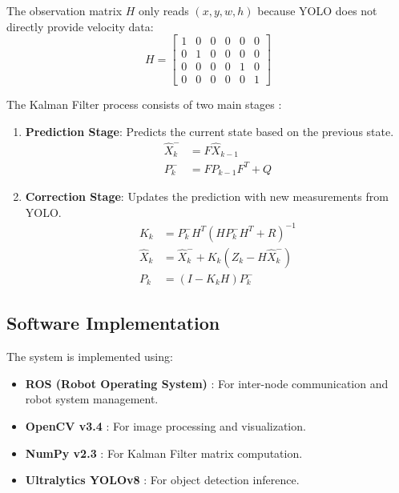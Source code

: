 \documentclass[12pt,a4paper]{article}
\begin{document}
The observation matrix $H$ only reads $(x, y, w, h)$ because YOLO does not directly provide velocity data:
\begin{equation}
H = \begin{bmatrix}
1 & 0 & 0 & 0 & 0 & 0 \\
0 & 1 & 0 & 0 & 0 & 0 \\
0 & 0 & 0 & 0 & 1 & 0 \\
0 & 0 & 0 & 0 & 0 & 1
\end{bmatrix}
\end{equation}

The Kalman Filter process consists of two main stages \cite{Ultralytics2025}:
\begin{enumerate}
    \item \textbf{Prediction Stage}: Predicts the current state based on the previous state.
    \begin{align}
    \hat{X}_k^- &= F \hat{X}_{k-1} \\
    P_k^- &= F P_{k-1} F^T + Q
    \end{align}
    \item \textbf{Correction Stage}: Updates the prediction with new measurements from YOLO.
    \begin{align}
    K_k &= P_k^- H^T (H P_k^- H^T + R)^{-1} \\
    \hat{X}_k &= \hat{X}_k^- + K_k (Z_k - H \hat{X}_k^-) \\
    P_k &= (I - K_k H) P_k^-
    \end{align}
\end{enumerate}

\subsection{Software Implementation}
The system is implemented using:
\begin{itemize}
    \item \textbf{ROS (Robot Operating System)} \cite{Quigley2009}: For inter-node communication and robot system management.
    \item \textbf{OpenCV v3.4} \cite{OpenCV2025}: For image processing and visualization.
    \item \textbf{NumPy v2.3} \cite{NumPy2025}: For Kalman Filter matrix computation.
    \item \textbf{Ultralytics YOLOv8} \cite{Ultralytics2025}: For object detection inference.
\end{itemize}
\end{document}

